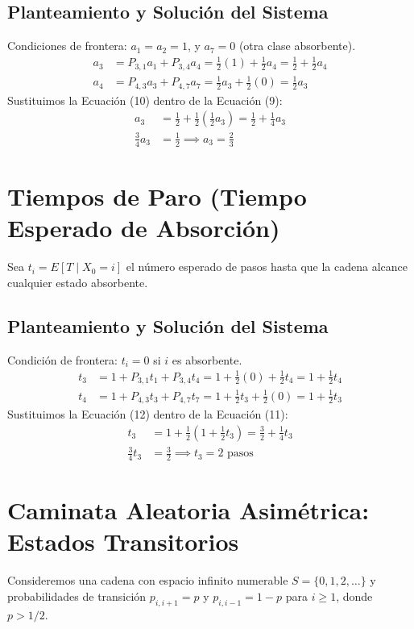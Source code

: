 \documentclass[12pt, a4paper]{article}
\begin{document}
\subsection{Planteamiento y Solución del Sistema}
Condiciones de frontera: $a_1 = a_2 = 1$, y $a_7 = 0$ (otra clase absorbente).
\begin{align}
    a_3 &= P_{3,1}a_1 + P_{3,4}a_4 = \frac{1}{2}(1) + \frac{1}{2}a_4 = \frac{1}{2} + \frac{1}{2}a_4 \\
    a_4 &= P_{4,3}a_3 + P_{4,7}a_7 = \frac{1}{2}a_3 + \frac{1}{2}(0) = \frac{1}{2}a_3
\end{align}
Sustituimos la Ecuación (10) dentro de la Ecuación (9):
\begin{align*}
    a_3 &= \frac{1}{2} + \frac{1}{2}\left( \frac{1}{2}a_3 \right) = \frac{1}{2} + \frac{1}{4}a_3 \\
    \frac{3}{4}a_3 &= \frac{1}{2} \implies a_3 = \frac{2}{3}
\end{align*}

\section{Tiempos de Paro (Tiempo Esperado de Absorción)}
Sea $t_i = E[T \mid X_0 = i]$ el número esperado de pasos hasta que la cadena alcance cualquier estado absorbente.

\subsection{Planteamiento y Solución del Sistema}
Condición de frontera: $t_i = 0$ si $i$ es absorbente.
\begin{align}
    t_3 &= 1 + P_{3,1}t_1 + P_{3,4}t_4 = 1 + \frac{1}{2}(0) + \frac{1}{2}t_4 = 1 + \frac{1}{2}t_4 \\
    t_4 &= 1 + P_{4,3}t_3 + P_{4,7}t_7 = 1 + \frac{1}{2}t_3 + \frac{1}{2}(0) = 1 + \frac{1}{2}t_3
\end{align}
Sustituimos la Ecuación (12) dentro de la Ecuación (11):
\begin{align*}
    t_3 &= 1 + \frac{1}{2}\left( 1 + \frac{1}{2}t_3 \right) = \frac{3}{2} + \frac{1}{4}t_3 \\
    \frac{3}{4}t_3 &= \frac{3}{2} \implies t_3 = 2 \text{ pasos}
\end{align*}

\section{Caminata Aleatoria Asimétrica: Estados Transitorios}
Consideremos una cadena con espacio infinito numerable $S=\{0,1,2,\dots\}$ y probabilidades de transición $p_{i,i+1}=p$ y $p_{i,i-1}=1-p$ para $i\ge 1$, donde $p > 1/2$.
\end{document}
